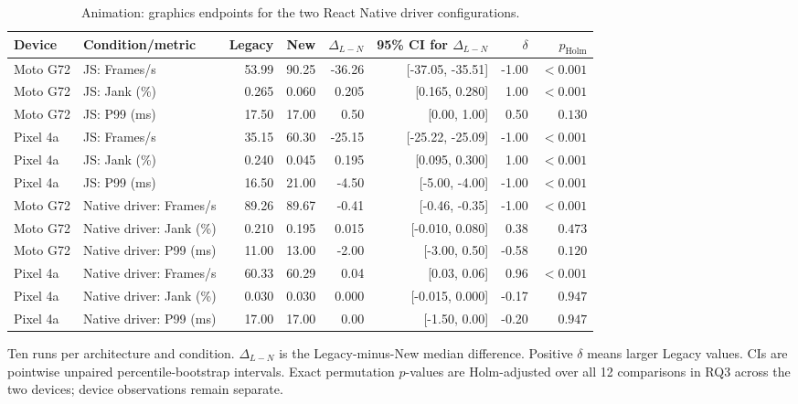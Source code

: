 \begin{table}[!t]
\centering
\caption{Animation: graphics endpoints for the two React Native driver configurations.}
\label{tab:s3}
\small\setlength{\tabcolsep}{5pt}
\begin{tabular}{llrrrrrr}
\toprule
Device & Condition/metric & Legacy & New & $\Delta_{L-N}$ & 95\% CI for $\Delta_{L-N}$ & $\delta$ & $p_{\mathrm{Holm}}$ \\
\midrule
Moto G72 & JS: Frames/s & 53.99 & 90.25 & -36.26 & [-37.05, -35.51] & -1.00 & $<0.001$ \\
Moto G72 & JS: Jank (\%) & 0.265 & 0.060 & 0.205 & [0.165, 0.280] & 1.00 & $<0.001$ \\
Moto G72 & JS: P99 (ms) & 17.50 & 17.00 & 0.50 & [0.00, 1.00] & 0.50 & $0.130$ \\
Pixel 4a & JS: Frames/s & 35.15 & 60.30 & -25.15 & [-25.22, -25.09] & -1.00 & $<0.001$ \\
Pixel 4a & JS: Jank (\%) & 0.240 & 0.045 & 0.195 & [0.095, 0.300] & 1.00 & $<0.001$ \\
Pixel 4a & JS: P99 (ms) & 16.50 & 21.00 & -4.50 & [-5.00, -4.00] & -1.00 & $<0.001$ \\
Moto G72 & Native driver: Frames/s & 89.26 & 89.67 & -0.41 & [-0.46, -0.35] & -1.00 & $<0.001$ \\
Moto G72 & Native driver: Jank (\%) & 0.210 & 0.195 & 0.015 & [-0.010, 0.080] & 0.38 & $0.473$ \\
Moto G72 & Native driver: P99 (ms) & 11.00 & 13.00 & -2.00 & [-3.00, 0.50] & -0.58 & $0.120$ \\
Pixel 4a & Native driver: Frames/s & 60.33 & 60.29 & 0.04 & [0.03, 0.06] & 0.96 & $<0.001$ \\
Pixel 4a & Native driver: Jank (\%) & 0.030 & 0.030 & 0.000 & [-0.015, 0.000] & -0.17 & $0.947$ \\
Pixel 4a & Native driver: P99 (ms) & 17.00 & 17.00 & 0.00 & [-1.50, 0.00] & -0.20 & $0.947$ \\
\bottomrule
\end{tabular}
\par\smallskip
\begin{minipage}{0.98\textwidth}\footnotesize
Ten runs per architecture and condition. $\Delta_{L-N}$ is the Legacy-minus-New median difference. Positive $\delta$ means larger Legacy values. CIs are pointwise unpaired percentile-bootstrap intervals. Exact permutation $p$-values are Holm-adjusted over all 12 comparisons in RQ3 across the two devices; device observations remain separate.
\end{minipage}
\end{table}
